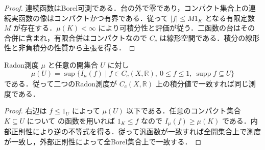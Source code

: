 \begin{proof}
連続函数はBorel可測である．台の外で零であり，コンパクト集合上の連続実函数の像はコンパクトかつ有界である．従って $|f|\leq M1_K$ となる有限定数 $M$ が存在する．$\mu(K)<\infty$ により可積分性と評価が従う．二函数の台はその合併に含まれ，有限合併はコンパクトなので $C_c$ は線形空間である．積分の線形性と非負積分の性質から主張を得る．
\end{proof}
\begin{prop}[コンパクト台連続函数によるRadon測度の一意性]
Radon測度 $\mu$ と任意の開集合 $U$ に対し
\[
\mu(U)=\sup\{I_\mu(f)\mid f\in C_c(X,\mathbb R),\ 0\leq f\leq1,\ \operatorname{supp}f\subseteq U\}
\]
である．従って二つのRadon測度が $C_c(X,\mathbb R)$ 上の積分値で一致すれば同じ測度である．
\end{prop}
\begin{proof}
右辺は $f\leq1_U$ によって $\mu(U)$ 以下である．任意のコンパクト集合 $K\subseteq U$ について  の函数を用いれば $1_K\leq f$ なので $I_\mu(f)\geq\mu(K)$ である．内部正則性により逆の不等式を得る．従って汎函数が一致すれば全開集合上で測度が一致し，外部正則性によって全Borel集合上で一致する．
\end{proof}
